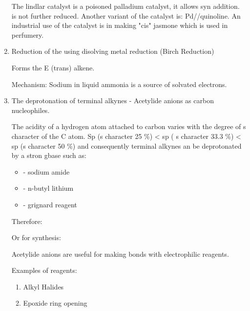 \begin{enumerate}[label=\alph*)]

    The lindlar catalyst is a poisoned palladium catalyst, it allows syn addition.
     is not further reduced. Another variant of the catalyst is:
    Pd//quinoline. An industrial use of the catalyst is in making "cis"
    jasmone which is used in perfumery.

  \item Reduction of the  using disolving metal reduction (Birch
    Reduction)

    Forms the E (trans) alkene.


    Mechanism: Sodium in liquid ammonia is a source of solvated electrons.


  \item The deprotonation of terminal alkynes - Acetylide anions as carbon
    nucleophiles.

    The acidity of a hydrogen atom attached to carbon varies with the degree of
    s character of the C atom. Sp (s character 25 \%) < sp (
    s character 33.3 \%) < sp (s character 50 \%) and consequently terminal
    alkynes an be deprotonated by a stron gbase such as:

    \begin{itemize}
      \item {} - sodium amide
      \item {} - n-butyl lithium
      \item {} - grignard reagent
    \end{itemize}

    Therefore:


    Or for synthesis:


    Acetylide anions are useful for making  bonds with electrophilic
    reagents.


    Examples of reagents:

    \begin{enumerate}[label=\roman*)]

      \item Alkyl Halides

      \item Epoxide ring opening


\end{enumerate}
\end{enumerate}
